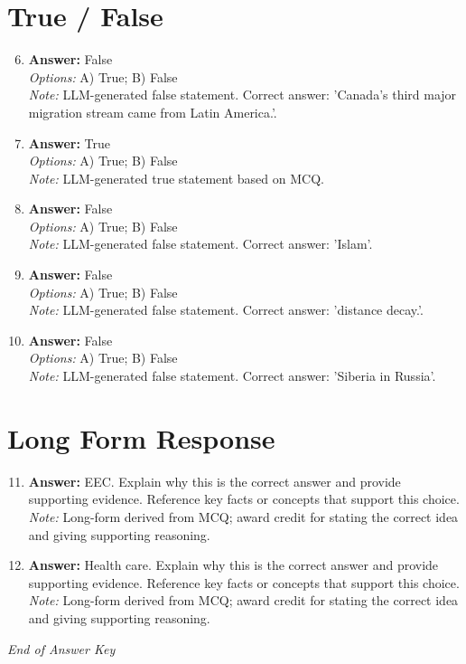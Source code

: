 \documentclass[12pt]{article}
\begin{document}
\section*{True / False}
\begin{enumerate}[label=\arabic*.]
\setcounter{enumi}{5}
\item \textbf{Answer:} False
\\ \textit{Options:} A) True; B) False
\\ \textit{Note:} LLM-generated false statement. Correct answer: 'Canada's third major migration stream came from Latin America.'.
\item \textbf{Answer:} True
\\ \textit{Options:} A) True; B) False
\\ \textit{Note:} LLM-generated true statement based on MCQ.
\item \textbf{Answer:} False
\\ \textit{Options:} A) True; B) False
\\ \textit{Note:} LLM-generated false statement. Correct answer: 'Islam'.
\item \textbf{Answer:} False
\\ \textit{Options:} A) True; B) False
\\ \textit{Note:} LLM-generated false statement. Correct answer: 'distance decay.'.
\item \textbf{Answer:} False
\\ \textit{Options:} A) True; B) False
\\ \textit{Note:} LLM-generated false statement. Correct answer: 'Siberia in Russia'.
\end{enumerate}

\section*{Long Form Response}
\begin{enumerate}[label=\arabic*.]
\setcounter{enumi}{10}
\item \textbf{Answer:} EEC. Explain why this is the correct answer and provide supporting evidence. Reference key facts or concepts that support this choice.
\\ \textit{Note:} Long-form derived from MCQ; award credit for stating the correct idea and giving supporting reasoning.
\item \textbf{Answer:} Health care. Explain why this is the correct answer and provide supporting evidence. Reference key facts or concepts that support this choice.
\\ \textit{Note:} Long-form derived from MCQ; award credit for stating the correct idea and giving supporting reasoning.
\end{enumerate}

\vfill
\noindent\textit{End of Answer Key}
\end{document}

